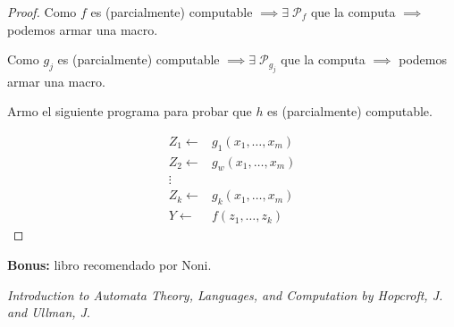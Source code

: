 \begin{proof} \phantom{.}

    Como $f$ es (parcialmente) computable 
    $\implies \exists \; \mathcal{P}_f$ que
    la computa $\implies$ podemos armar una macro.

    Como $g_j$ es (parcialmente) computable 
    $\implies \exists \; \mathcal{P}_{g_j}$ 
    que la computa $\implies$ podemos armar una macro.

    Armo el siguiente programa para probar que $h$ es (parcialmente) 
    computable.

    \begin{align*}
        Z_1 \gets& g_1 (x_1, \dotsc, x_m) \\
        Z_2 \gets& g_w (x_1, \dotsc, x_m) \\
        \vdots & \\
        Z_k \gets& g_k (x_1, \dotsc, x_m) \\
        Y \gets& f(z_1, \dotsc, z_k)
    \end{align*}
\end{proof}



\textbf{Bonus:} libro recomendado por Noni.

\textit{Introduction to Automata Theory, Languages, and Computation by 
Hopcroft, J. and Ullman, J}.

